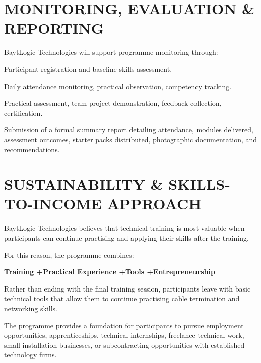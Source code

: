 \documentclass[11pt,a4paper]{article}
\begin{document}
\section{MONITORING, EVALUATION \& REPORTING}
BaytLogic Technologies will support programme monitoring through:

\begin{description}[style=multiline, leftmargin=3.2cm]
    \item[Pre-Training:] Participant registration and baseline skills assessment.
    \item[During Training:] Daily attendance monitoring, practical observation, competency tracking.
    \item[End of Training:] Practical assessment, team project demonstration, feedback collection, certification.
    \item[Post-Training Report:] Submission of a formal summary report detailing attendance, modules delivered, assessment outcomes, starter packs distributed, photographic documentation, and recommendations.
\end{description}

\section{SUSTAINABILITY \& SKILLS-TO-INCOME APPROACH}
BaytLogic Technologies believes that technical training is most valuable when participants can continue practising and applying their skills after the training.

For this reason, the programme combines:
\begin{center}
    \textbf{Training \quad+\quad Practical Experience \quad+\quad Tools \quad+\quad Entrepreneurship}
\end{center}

Rather than ending with the final training session, participants leave with basic technical tools that allow them to continue practising cable termination and networking skills.

The programme provides a foundation for participants to pursue employment opportunities, apprenticeships, technical internships, freelance technical work, small installation businesses, or subcontracting opportunities with established technology firms.
\end{document}
